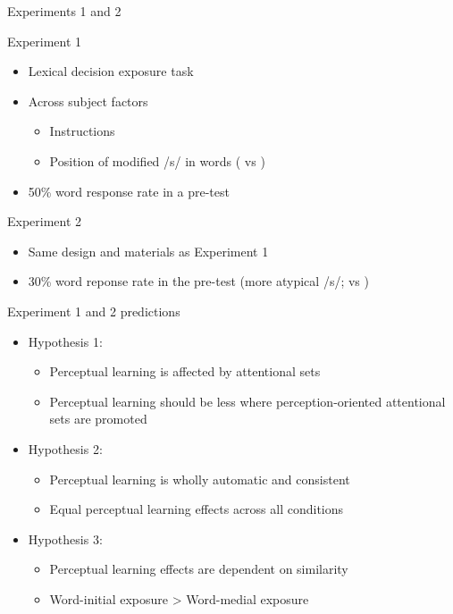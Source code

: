 \documentclass{beamer}
\begin{document}
\begin{frame}{Experiments 1 and 2}

Experiment 1
\begin{itemize}
\item Lexical decision exposure task
\item Across subject factors
\begin{itemize}
\item Instructions
\item Position of modified /s/ in words ( vs )
\end{itemize}
\item 50\% word response rate in a pre-test
\end{itemize}
Experiment 2
\begin{itemize}
\item Same design and materials as Experiment 1
\item 30\% word reponse rate in the pre-test (more atypical /s/;  vs )
\end{itemize}

\end{frame}

\begin{frame}{Experiment 1 and 2 predictions}

\begin{itemize}
\item Hypothesis 1:
\begin{itemize}
\item Perceptual learning is affected by attentional sets
\item Perceptual learning should be less where perception-oriented attentional sets are promoted
\end{itemize}
\item Hypothesis 2:
\begin{itemize}
\item Perceptual learning is wholly automatic and consistent
\item Equal perceptual learning effects across all conditions
\end{itemize}
\item Hypothesis 3:
\begin{itemize}
\item Perceptual learning effects are dependent on similarity
\item Word-initial exposure > Word-medial exposure
\end{itemize}
\end{itemize}
\end{frame}
\end{document}
